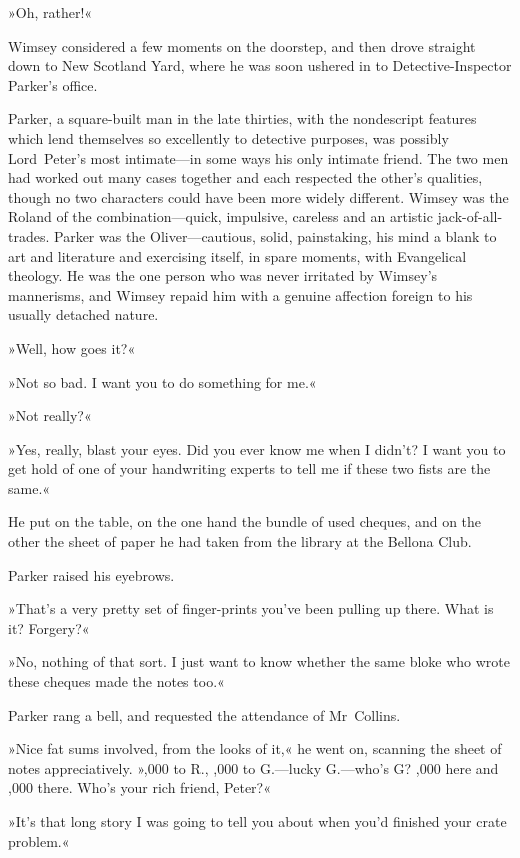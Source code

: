 »Oh, rather!«

Wimsey considered a few moments on the doorstep, and then drove straight down to New Scotland Yard, where he was soon ushered in to Detective-Inspector Parker's office.

Parker, a square-built man in the late thirties, with the nondescript features which lend themselves so excellently to detective purposes, was possibly Lord~Peter's most intimate—in some ways his only intimate friend. The two men had worked out many cases together and each respected the other's qualities, though no two characters could have been more widely different. Wimsey was the Roland of the combination—quick, impulsive, careless and an artistic jack-of-all-trades. Parker was the Oliver—cautious, solid, painstaking, his mind a blank to art and literature and exercising itself, in spare moments, with Evangelical theology. He was the one person who was never irritated by Wimsey's mannerisms, and Wimsey repaid him with a genuine affection foreign to his usually detached nature.

»Well, how goes it?«

»Not so bad. I want you to do something for me.«

»Not really?«

»Yes, really, blast your eyes. Did you ever know me when I didn't? I want you to get hold of one of your handwriting experts to tell me if these two fists are the same.«

He put on the table, on the one hand the bundle of used cheques, and on the other the sheet of paper he had taken from the library at the Bellona Club.

Parker raised his eyebrows.

»That's a very pretty set of finger-prints you've been pulling up there. What is it? Forgery?«

»No, nothing of that sort. I just want to know whether the same bloke who wrote these cheques made the notes too.«

Parker rang a bell, and requested the attendance of Mr~Collins.

»Nice fat sums involved, from the looks of it,« he went on, scanning the sheet of notes appreciatively. »,000 to R., ,000 to G.—lucky G.—who's G? ,000 here and ,000 there. Who's your rich friend, Peter?«

»It's that long story I was going to tell you about when you'd finished your crate problem.«


